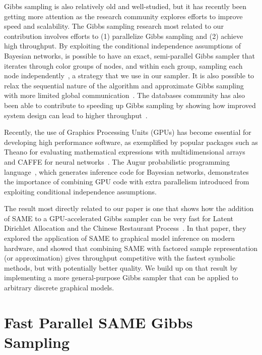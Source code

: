 \documentclass{article} %
\begin{document}
Gibbs sampling is also relatively old and well-studied, but it has recently been getting more
attention as the research community explores efforts to improve speed and scalability. The Gibbs
sampling research most related to our contribution involves efforts to (1) parallelize Gibbs
sampling and (2) achieve high throughput. By exploiting the conditional independence assumptions of
Bayesian networks, is possible to have an exact, semi-parallel Gibbs sampler that iterates through
color groups of nodes, and within each group, sampling each node independently~\citep{Gonzalez2011},
a strategy that we use in our sampler. It is also possible to relax the sequential nature of the
algorithm and approximate Gibbs sampling with more limited global communication~\citep{Johnson2013}.
The databases community has also been able to contribute to speeding up Gibbs sampling by showing
how improved system design can lead to higher throughput~\citep{Zhang2013}.

Recently, the use of Graphics Processing Units (GPUs) has become essential for developing high
performance software, as exemplified by popular packages such as Theano for evaluating mathematical
expressions with multidimensional arrays~\citep{Theano2012} and CAFFE for neural
networks~\citep{jia2014caffe}.  The Augur probabilistic programming language~\citep{Augur2014},
which generates inference code for Bayesian networks, demonstrates the importance of combining GPU
code with extra parallelism introduced from exploiting conditional independence assumptions.

The result most directly related to our paper is one that shows how the addition of SAME to a
GPU-accelerated Gibbs sampler can be very fast for Latent Dirichlet Allocation and the Chinese
Restaurant Process~\citep{SAME2015}. In that paper, they explored the application of SAME to
graphical model inference on modern hardware, and showed that combining SAME with factored sample
representation (or approximation) gives throughput competitive with the fastest symbolic methods,
but with potentially better quality. We build up on that result by implementing a more
general-purpose Gibbs sampler that can be applied to arbitrary discrete graphical models.





\section{Fast Parallel SAME Gibbs Sampling}\label{sec:same}
\end{document}
